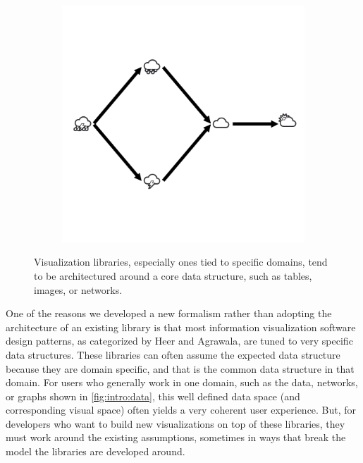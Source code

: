 \documentclass[../main.tex]{subfiles}
\begin{document}
\begin{figure}[H]
\begin{subfigure}{.3\textwidth}
        \includegraphics[width=1\textwidth]{figures/math/graph.png}
    \end{subfigure}
    \caption{Visualization libraries, especially ones tied to specific domains, tend to be architectured around a core data structure, such as tables, images, or networks. }
    \label{fig:intro:data}
\end{figure}

One of the reasons we developed a new formalism rather than adopting the architecture of an existing library is that most information visualization software design patterns, as categorized by Heer and Agrawala\cite{HeerSoftware2006}, are tuned to very specific data structures. These libraries can often assume the expected data structure because they are domain specific, and that is the common data structure in that domain.  For users who generally work in one domain, such as the data, networks, or graphs shown in \autoref{fig:intro:data}, this well defined data space (and corresponding visual space\cite{chiTaxonomyVisualizationTechniques2000}) often yields a very coherent user experience\cite{heerDeclarative2010}. But, for developers who want to build new visualizations on top of these libraries, they must work around the existing assumptions, sometimes in ways that break the model the libraries are developed around. 
\end{document}

